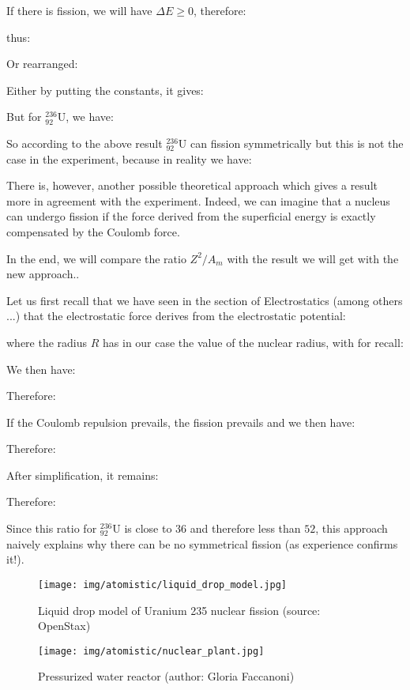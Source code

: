 	
	\begin{tcolorbox}[colframe=black,colback=white,sharp corners]
	If there is fission, we will have $\Delta E\ge 0$, therefore:
	
	thus:
	
	Or rearranged:
	
	Either by putting the constants, it gives:
	
	But for $_{92}^{236}\mathrm{U}$, we have:
	
	So according to the above result $_{92}^{236}\mathrm{U}$ can fission symmetrically but this is not the case in the experiment, because in reality we have:
	
	\end{tcolorbox}
	There is, however, another possible theoretical approach which gives a result more in agreement with the experiment. Indeed, we can imagine that a nucleus can undergo fission if the force derived from the superficial energy is exactly compensated by the Coulomb force.

	In the end, we will compare the ratio $Z^2/A_m$ with the result we will get with the new approach..

	Let us first recall that we have seen in the section of Electrostatics (among others ...) that the electrostatic force derives from the electrostatic potential:
	
	where the radius $R$ has in our case the value of the nuclear radius, with for recall:
	
	We then have:
	
	Therefore:
	
	If the Coulomb repulsion prevails, the fission prevails and we then have:
	
	Therefore:
	
	After simplification, it remains:
	
	Therefore:
	
	Since this ratio for $_{92}^{236}\mathrm{U}$ is close to $36$ and therefore less than $52$, this approach naively explains why there can be no symmetrical fission (as experience confirms it!).
	
	\begin{figure}[H]
		\centering
		\texttt{[image: img/atomistic/liquid\_drop\_model.jpg]}
		\caption[Liquid drop model of Uranium 235 nuclear fission]{Liquid drop model of Uranium 235 nuclear fission (source: OpenStax)}
	\end{figure}
	
	\begin{figure}[H]
		\centering
		\texttt{[image: img/atomistic/nuclear\_plant.jpg]}
		\caption[Pressurized water reactor]{Pressurized water reactor (author: Gloria Faccanoni)}
	\end{figure}
	
